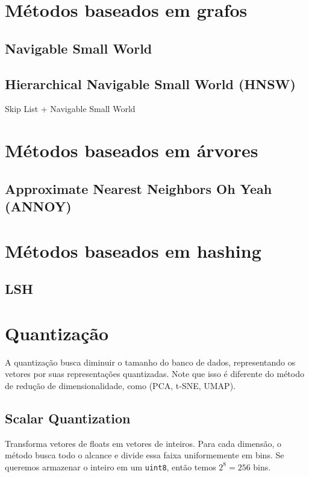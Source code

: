 \section{Métodos baseados em grafos}

\subsection{Navigable Small World}

\cite{smallworldgraphs:malkov2014}

\subsection{Hierarchical Navigable Small World (HNSW)}

Skip List + Navigable Small World

\section{Métodos baseados em árvores}

\subsection{Approximate Nearest Neighbors Oh Yeah (ANNOY)}

\section{Métodos baseados em hashing}

\subsection{LSH}

\section{Quantização}

A quantização busca diminuir o tamanho do banco de dados, representando os vetores por suas representações quantizadas. Note que isso é diferente do método de redução de dimensionalidade, como (PCA, t-SNE, UMAP).

\subsection{Scalar Quantization}

Transforma vetores de floats em vetores de inteiros. Para cada dimensão, o método busca todo o alcance e divide essa faixa uniformemente em bins. Se queremos armazenar o inteiro em um \texttt{uint8}, então temos $2^8 = 256$ bins.

